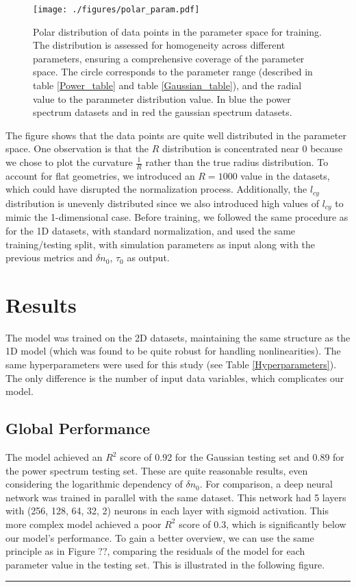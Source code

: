 \documentclass[11pt,a4paper,openany]{report}
\begin{document}
\begin{multicols}{2}
    \begin{figure}[H]
        \centering
        \texttt{[image: ./figures/polar\_param.pdf]}
        \caption{Polar distribution of data points in the parameter space for training. The distribution is assessed for homogeneity across different parameters, ensuring a comprehensive coverage of the parameter space. The circle corresponds to the parameter range (described in table \ref{Power_table} and table \ref{Gaussian_table}), and the radial value to the paranmeter distribution value. In blue the power spectrum datasets and in red the gaussian spectrum datasets.}
        \label{params_distr}
    \end{figure}
    The figure shows that the data points are quite well distributed in the parameter space. One observation is that the $R$ distribution is concentrated near 0 because we chose to plot the curvature $\frac{1}{R}$ rather than the true radius distribution. To account for flat geometries, we introduced an $R = 1000$ value in the datasets, which could have disrupted the normalization process. Additionally, the $l_{cy}$ distribution is unevenly distributed since we also introduced high values of $l_{cy}$ to mimic the 1-dimensional case. Before training, we followed the same procedure as for the 1D datasets, with standard normalization, and used the same training/testing split, with simulation parameters as input along with the previous metrics and $\delta n_0$, $\tau_0$ as output.

    \section{Results}

    The model was trained on the 2D datasets, maintaining the same structure as the 1D model (which was found to be quite robust for handling nonlinearities). The same hyperparameters were used for this study (see Table \ref{Hyperparameters}). The only difference is the number of input data variables, which complicates our model.

    \subsection{Global Performance}

    The model achieved an $R^2$ score of 0.92 for the Gaussian testing set and 0.89 for the power spectrum testing set. These are quite reasonable results, even considering the logarithmic dependency of $\delta n_0$. For comparison, a deep neural network was trained in parallel with the same dataset. This network had 5 layers with (256, 128, 64, 32, 2) neurons in each layer with sigmoid activation. This more complex model achieved a poor $R^2$ score of 0.3, which is significantly below our model's performance. To gain a better overview, we can use the same principle as in Figure ??, comparing the residuals of the model for each parameter value in the testing set. This is illustrated in the following figure.
\end{multicols}
\rule{\linewidth}{0.4pt}
\end{document}
